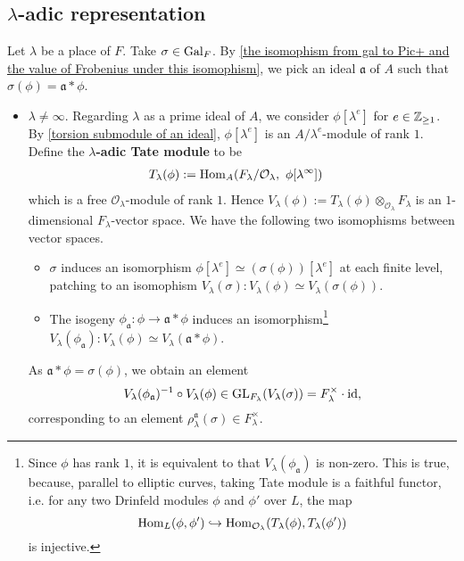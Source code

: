 \documentclass{article}
\renewcommand{\O}{\mathcal{O}}
\newcommand{\m}{\mathfrak{m}}
\begin{document}
\subsection{\texorpdfstring{$\lambda$}{lambda}-adic representation}
Let $\lambda$ be a place of $F$.
Take $\sigma\in\operatorname{Gal}_F$. By \cref{the isomophism from gal to Pic+ and the value of Frobenius under this isomophism}, we pick an ideal $\mathfrak{a}$ of $A$ such that $\sigma(\phi) = \mathfrak{a} * \phi$.
\begin{itemize}
\item $\lambda\ne \infty$.
Regarding $\lambda$ as a prime ideal of $A$, we consider $\phi[\lambda^e]$ for $e\in\mathbb{Z}_{\ge 1}$.
By \cref{torsion submodule of an ideal},
$\phi[\lambda^e]$ is an $A/\lambda^e$-module of rank $1$.
Define the \textbf{$\lambda$-adic Tate module} to be\begin{align*}
    &T_\lambda(\phi) := \Hom_A(F_\lambda/\O_\lambda,\ \phi[\lambda^\infty])
\end{align*}
which is a free $\O_\lambda$-module of rank $1$.
Hence $V_\lambda(\phi) := T_\lambda(\phi)\otimes_{\O_\lambda} F_\lambda$ is an $1$-dimensional $F_\lambda$-vector space.
We have the following two isomophisms between vector spaces.
\begin{itemize}
    \item $\sigma$ induces an isomorphism $\phi[\lambda^e]\simeq (\sigma (\phi))[\lambda^e]$ at each finite level,
    patching to an isomophism $V_\lambda(\sigma) : V_\lambda(\phi)\simeq V_\lambda(\sigma(\phi))$.
    \item The isogeny $\phi_\mathfrak{a} : \phi\to\mathfrak{a} * \phi$ induces an isomorphism\footnote{
        Since $\phi$ has rank $1$, it is equivalent to that $V_\lambda(\phi_\mathfrak{a})$ is non-zero.
        This is true, because, parallel to elliptic curves, taking Tate module is a faithful functor, i.e. for any two Drinfeld modules $\phi$ and $\phi'$ over $L$, the map
        \[\Hom_{L}(\phi, \phi')\hookrightarrow \Hom_{\O_\lambda}(T_\lambda(\phi), T_\lambda(\phi'))\]
        is injective.
    } $V_\lambda(\phi_\mathfrak{a}) : V_\lambda(\phi)\simeq V_\lambda(\mathfrak{a}*\phi)$.
\end{itemize}
As $\mathfrak{a} * \phi = \sigma(\phi)$, we obtain an element \[V_\lambda(\phi_\mathfrak{a})^{-1}\circ V_\lambda(\phi)\in\operatorname{GL}_{F_\lambda}(V_\lambda(\sigma)) = F_\lambda^\times\cdot\operatorname{id},\]
corresponding to an element $\rho_\lambda^\mathfrak{a}(\sigma)\in F_\lambda^\times$.


\end{itemize}
\end{document}
